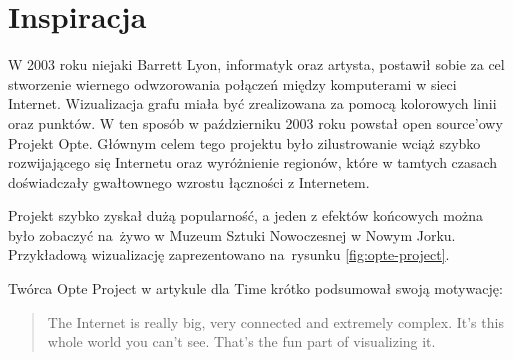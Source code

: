 \section{Inspiracja}
W 2003 roku niejaki Barrett Lyon, informatyk oraz artysta, postawił sobie za cel stworzenie wiernego odwzorowania połączeń między komputerami w sieci Internet. Wizualizacja grafu miała być zrealizowana za pomocą kolorowych linii oraz punktów. W ten sposób w październiku 2003 roku powstał open source'owy Projekt Opte. Głównym celem tego projektu było zilustrowanie wciąż szybko rozwijającego się Internetu oraz wyróżnienie regionów, które w tamtych czasach doświadczały gwałtownego wzrostu łączności z Internetem.

Projekt szybko zyskał dużą popularność, a jeden z efektów końcowych można było zobaczyć na~żywo w Muzeum Sztuki Nowoczesnej w Nowym Jorku. Przykładową wizualizację zaprezentowano na~rysunku \ref{fig:opte-project}.

Twórca Opte Project w artykule dla Time \cite{OpteProject:Time} krótko podsumował swoją motywację:

\begin{center}
	\hyphenblockcquote{USenglish}{OpteProject:Time}{
		The Internet is really big, very connected and extremely complex. \linebreak
		It’s this whole world you can’t see. That’s the fun part of visualizing it.
	}
\end{center}

